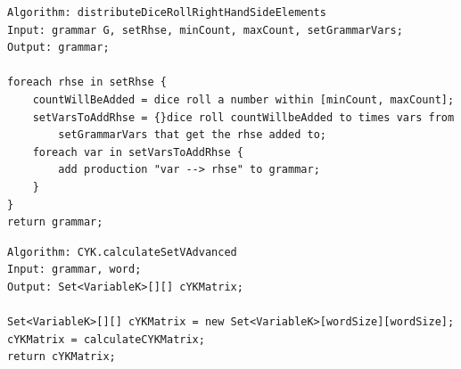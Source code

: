 \lstset{}
\begin{lstlisting}[frame=htrbl, caption={distributeDiceRollRightHandSideElementsShort}, 
label={lst:distributeDiceRollRightHandSideElementsShort}]
Algorithm: distributeDiceRollRightHandSideElements
Input: grammar G, setRhse, minCount, maxCount, setGrammarVars;
Output: grammar;

foreach rhse in setRhse { 
	countWillBeAdded = dice roll a number within [minCount, maxCount];
	setVarsToAddRhse = {}dice roll countWillbeAdded to times vars from 	
		setGrammarVars that get the rhse added to;
	foreach var in setVarsToAddRhse {
		add production "var --> rhse" to grammar;
	}
}
return grammar;
\end{lstlisting}


\pagebreak

\lstset{language=java}
\begin{lstlisting}[frame=htrbl, caption={CYK.calculateSetVAdvanced}, 
label={lst:CYK.calculateSetVAdvanced}]
Algorithm: CYK.calculateSetVAdvanced
Input: grammar, word;
Output: Set<VariableK>[][] cYKMatrix;

Set<VariableK>[][] cYKMatrix = new Set<VariableK>[wordSize][wordSize];
cYKMatrix = calculateCYKMatrix;
return cYKMatrix;
\end{lstlisting}

\pagebreak

